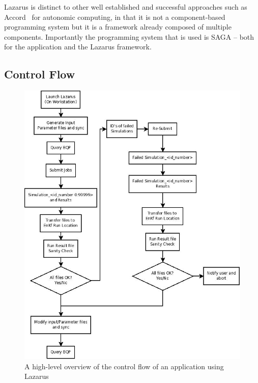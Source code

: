 \documentclass{sig-alternate}
\newcommand{\up}{\vspace*{-0.3em}}
\begin{document}
Lazarus is distinct to other well established and successful approaches such as Accord~\cite{accord} for autonomic computing, in that it is not a component-based programming system but it is a framework already composed of multiple components. Importantly the programming system that is used is SAGA -- both for the application and the Lazarus framework.

\up\up\up
\subsection{Control Flow}

\begin{figure}
\begin{center}
\includegraphics[scale=0.35]{./figures/Diagram1.jpeg}
\end{center}
\caption{A high-level overview of the control flow of an application using Lazarus}
\up\up\up \up\up\up \up
\label{fig:controlflow}
\end{figure}
\end{document}
